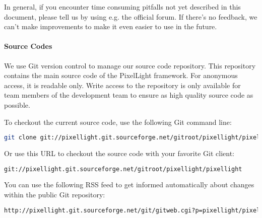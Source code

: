 In general, if you encounter time consuming pitfalls not yet described in this document, please tell us by using e.g. the official forum. If there's no feedback, we can't make improvements to make it even easier to use in the future.


\paragraph{Source Codes}
We use Git version control to manage our source code repository. This repository contains the main source code of the PixelLight framework. For anonymous access, it is readable only. Write access to the repository is only available for team members of the development team to ensure as high quality source code as possible.

To checkout the current source code, use the following Git command line:
\begin{lstlisting}[language=bash]
git clone git://pixellight.git.sourceforge.net/gitroot/pixellight/pixellight
\end{lstlisting}

Or use this URL to checkout the source code with your favorite Git client:
\begin{lstlisting}[language=bash]
git://pixellight.git.sourceforge.net/gitroot/pixellight/pixellight
\end{lstlisting}

You can use the following RSS feed to get informed automatically about changes within the public Git repository:
\begin{lstlisting}[language=bash]
http://pixellight.git.sourceforge.net/git/gitweb.cgi?p=pixellight/pixellight;a=rss
\end{lstlisting}
